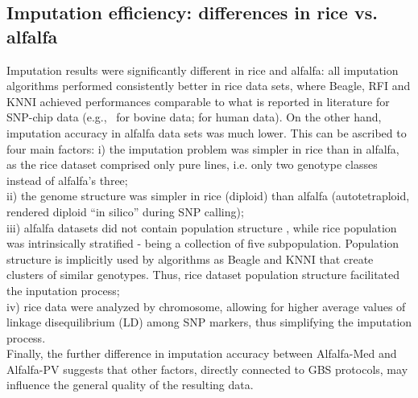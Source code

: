\subsection{Imputation efficiency: differences in rice vs. alfalfa}
\label{sec:role_of_species}
Imputation results were significantly different in rice and alfalfa: all imputation algorithms performed consistently better in rice data sets, where Beagle, RFI and KNNI achieved performances comparable to what is reported in literature for SNP-chip data (e.g.,~\cite{vanraden_genomic_2013} for bovine data;
\cite{the_1000_genomes_project_consortium_integrated_2012}
for human data). On the other hand, imputation accuracy in alfalfa data sets was much lower. This can be ascribed to four main factors: 
i) the imputation problem was simpler in rice than in alfalfa, as the rice dataset comprised only pure lines, i.e. only two genotype classes instead of alfalfa's three; \\
ii) the genome structure was simpler in rice (diploid) than alfalfa (autotetraploid, rendered diploid ``in silico'' during SNP calling);\\
iii) alfalfa datasets did not contain population structure \cite{Annicchiarico2015}, while rice population was intrinsically stratified - being a collection of five subpopulation. Population structure is implicitly used by algorithms as Beagle and KNNI that create clusters of similar genotypes. Thus, rice dataset population structure facilitated the inputation process;\\
iv) rice data were analyzed by chromosome, allowing for higher average values of linkage disequilibrium (LD) among SNP markers, thus simplifying the imputation process.\\
Finally, the further difference in imputation accuracy between Alfalfa-Med and Alfalfa-PV suggests that other factors, directly connected to GBS protocols, may influence the general quality of the resulting data.




